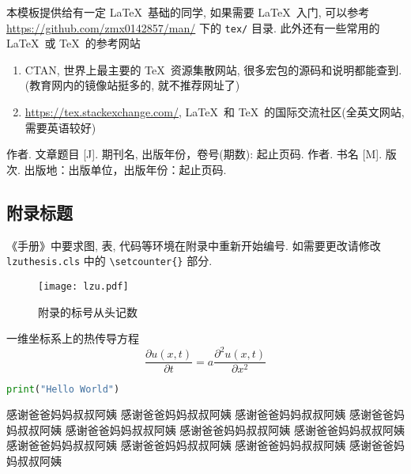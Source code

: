 \documentclass{lzuthesis}
\begin{document}
本模板提供给有一定 \LaTeX\ 基础的同学, 如果需要 \LaTeX\ 入门, 可以参考
\url{https://github.com/zmx0142857/man/} 下的 \verb|tex/| 目录.
此外还有一些常用的 \LaTeX\ 或 \TeX\ 的参考网站
\begin{enumerate}
	\item CTAN, 世界上最主要的 \TeX\ 资源集散网站,
		很多宏包的源码和说明都能查到. (教育网内的镜像站挺多的,
		就不推荐网址了)
	\item \url{https://tex.stackexchange.com/}, \LaTeX\ 和 \TeX\
		的国际交流社区(全英文网站, 需要英语较好)
\end{enumerate}

\begin{thebibliography}{00}
	 作者. 文章题目 [J].  期刊名, 出版年份，卷号(期数):
		起止页码.
	 作者. 书名 [M]. 版次.
		出版地：出版单位，出版年份：起止页码.
\end{thebibliography}

\begin{appendix}
	
\section{附录标题}

《手册》中要求图, 表, 代码等环境在附录中重新开始编号.
如需要更改请修改 \texttt{lzuthesis.cls} 中的 \verb|\setcounter{}| 部分. 

\begin{figure}[!h]
	\centering
	\texttt{[image: lzu.pdf]}
	\caption{附录的标号从头记数}
	\label{fu1}
\end{figure}

一维坐标系上的热传导方程
\begin{equation}
	\label{eq1}
	\frac{\partial u(x,t)}{\partial t}
	= a\frac{\partial ^{2}u(x,t)}{\partial x^{2}}
\end{equation}

\begin{lstlisting}[language=python, caption={helloworld.py}]
print("Hello World")
\end{lstlisting}
	
\end{appendix}

\begin{acknowledgement}
	感谢爸爸妈妈叔叔阿姨
	感谢爸爸妈妈叔叔阿姨
	感谢爸爸妈妈叔叔阿姨
	感谢爸爸妈妈叔叔阿姨
	感谢爸爸妈妈叔叔阿姨
	感谢爸爸妈妈叔叔阿姨
	感谢爸爸妈妈叔叔阿姨
	感谢爸爸妈妈叔叔阿姨
	感谢爸爸妈妈叔叔阿姨
	感谢爸爸妈妈叔叔阿姨
	感谢爸爸妈妈叔叔阿姨
\end{acknowledgement}

\makereviews
\end{document}
